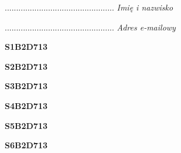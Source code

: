 \begin{turn}{90}\begin{minipage}{\linewidth} \vspace{20mm} ................................................  \textit{Imię i nazwisko}\end{minipage}\end{turn}

\begin{turn}{90}\begin{minipage}{\linewidth} \vspace{20mm} ................................................  \textit{Adres e-mailowy}\end{minipage}\end{turn}

\begin{turn}{90}\huge \begin{minipage}{\linewidth} \vspace{10mm}\textbf{S1B2D713}\end{minipage}\end{turn}

\begin{turn}{90}\huge \begin{minipage}{\linewidth} \vspace{10mm}\textbf{S2B2D713}\end{minipage}\end{turn}

\begin{turn}{90}\huge \begin{minipage}{\linewidth} \vspace{10mm}\textbf{S3B2D713}\end{minipage}\end{turn}

\begin{turn}{90}\huge \begin{minipage}{\linewidth} \vspace{10mm}\textbf{S4B2D713}\end{minipage}\end{turn}

\begin{turn}{90}\huge \begin{minipage}{\linewidth} \vspace{10mm}\textbf{S5B2D713}\end{minipage}\end{turn}

\begin{turn}{90}\huge \begin{minipage}{\linewidth} \vspace{10mm}\textbf{S6B2D713}\end{minipage}\end{turn}

